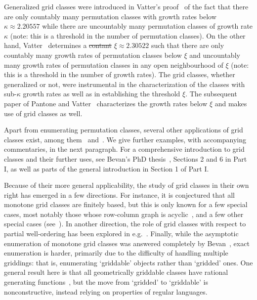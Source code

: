 \documentclass[12pt, a4paper, twoside]{report}
\providecommand{\DIFaddtex}[1]{{\protect\color{blue}\uwave{#1}}} %
\providecommand{\DIFdeltex}[1]{{\protect\color{red}\sout{#1}}}                      %
\providecommand{\DIFaddbegin}{} %
\providecommand{\DIFaddend}{} %
\providecommand{\DIFdelbegin}{} %
\providecommand{\DIFdelend}{} %
\providecommand{\DIFadd}[1]{\texorpdfstring{\DIFaddtex{#1}}{#1}} %
\providecommand{\DIFdel}[1]{\texorpdfstring{\DIFdeltex{#1}}{}} %
\begin{document}
Generalized grid classes were introduced in Vatter's proof~\cite{vatter11small} of the fact that there are only countably many permutation classes with growth rates below $\kappa \approx 2.20557$ while there are uncountably many permutation classes of growth rate $\kappa$ (note: this is a threshold in the number of permutation classes). On the other hand,  Vatter~\cite{vattercountableuncountable} determines a \DIFdelbegin \DIFdel{contant }\DIFdelend \DIFaddbegin \DIFadd{constant }\DIFaddend $\xi\approx 2.30522$ such that there are only countably many growth rates of permutation classes below $\xi$ and uncountably many growth rates of permutation classes in any open neighbourhood of $\xi$ (note: this is a threshold in the number of growth rates). The grid classes, whether generalized or not, were instrumental in the characterization of the classes with sub-$\kappa$ growth rates as well as in establishing the threshold $\xi$. The subsequent paper of Pantone and Vatter~\cite{pantonevatter16categorize} characterizes the growth rates below $\xi$ and makes use of grid classes as well.

Apart from enumerating permutation classes, several other applications of grid classes exist, among them~\cite{albert2011enumeration} and~\cite{bevan-new}. We give further examples, with accompanying commentaries, in the next paragraph. For a comprehensive introduction to grid classes and their further uses, see Bevan's PhD thesis~\cite{bevan2015thesis}, Sections 2 and 6 in Part I, as well as parts of the general introduction in Section 1 of Part I.

Because of their more general applicability, the study of grid classes in their own right has emerged in a few directions. For instance, it is conjectured that all monotone grid classes are finitely based, but this is only known for a few special cases, most notably those whose row-column graph is acyclic~\cite{aabrv2013}, and a few other special cases (see~\cite{albert-brignall-2times2, atkinson1997restricted, waton, bevan2015thesis}). In another direction, the role of grid classes with respect to partial well-ordering has been explored in e.g.~\cite{brignall2012pwo, murphy2003pwo, vatter2011pwo}. Finally, while the asymptotic enumeration of monotone grid classes was answered completely by Bevan~\cite{bevan15growth-rates}, exact enumeration is harder, primarily due to the difficulty of handling multiple griddings: that is, enumerating `griddable' objects rather than `gridded' ones. One general result here is that all geometrically griddable classes have rational generating functions~\cite{aabrv2013}, but the move from `gridded' to `griddable' is nonconstructive, instead relying on properties of regular languages.
\end{document}
